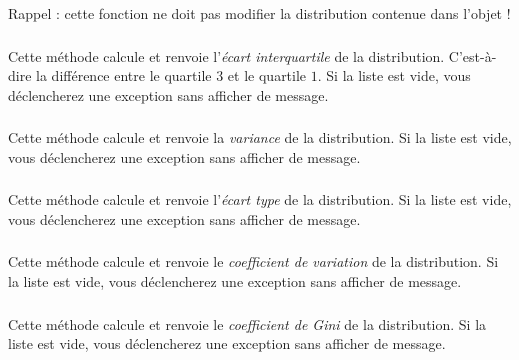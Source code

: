 \medskip

\noindent Rappel : cette fonction ne doit pas modifier la distribution contenue dans l'objet !



\subsubsection*{}

\noindent Cette méthode calcule et renvoie l'\textit{écart interquartile} de la distribution.
C'est-à-dire la différence entre le quartile $ 3 $ et le quartile $ 1 $.
Si la liste est vide, vous déclencherez une exception  sans afficher de message.


\subsubsection*{}

\noindent Cette méthode calcule et renvoie la \textit{variance} de la distribution.
Si la liste est vide, vous déclencherez une exception  sans afficher de message.


\subsubsection*{}

\noindent Cette méthode calcule et renvoie l'\textit{écart type} de la distribution.
Si la liste est vide, vous déclencherez une exception  sans afficher de message.


\subsubsection*{}

\noindent Cette méthode calcule et renvoie le \textit{coefficient de variation} de la distribution.
Si la liste est vide, vous déclencherez une exception  sans afficher de message.


\subsubsection*{}

\noindent Cette méthode calcule et renvoie le \textit{coefficient de Gini} de la distribution.
Si la liste est vide, vous déclencherez une exception  sans afficher de message.

